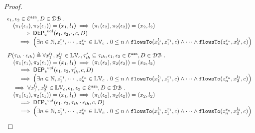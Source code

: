 \begin{proof}
$$\begin{array}{l}
\mathtt{\epsilon}_1, \mathtt{\epsilon}_2 \in \mathcal{E}^{\mathtt{{asn}}}, D \in \mathcal{DB} ~.~
\\ \quad
(\pi_{1}{(\mathtt{\epsilon}_1)}, \pi_{2}{(\mathtt{\epsilon}_1)}) = ({x}_1, l_1)
\implies
(\pi_{1}{(\mathtt{\epsilon}_2)}, \pi_{2}{(\mathtt{\epsilon}_2)}) = ({x}_2, l_2)
 \\ \qquad \implies 
\mathsf{DEP_{\mathtt{e}}}^{val}(\mathtt{\epsilon}_1, \mathtt{\epsilon}_2, \cdot, c, D)
 \\ \qquad \implies
   \Big(\exists  n \in \mathbb{N}, z_1^{r_1}, \cdots, z_n^{r_n} \in \mathbb{LV}_{{c}} ~.~ 0 \leq n
 \land \mathtt{flowsTo}(x_1^{l_1}, z_1^{r_1}, c) \land \cdots \land \mathtt{flowsTo}(z_n^{r_n}, {x}_2^{l_2}, c) \Big)
\end{array}
$$
%
$$
\begin{array}{l}
P(\mathtt{\tau}_{ih} \cdot \mathtt{\epsilon}_{ih})
\triangleq 
\forall {x}_1^{l_1}, {x}_2^{l_2} \in \mathbb{LV}_{{c}}, \mathtt{\tau}_{ih}' \subseteq \mathtt{\tau}_{ih},
\mathtt{\epsilon}_1, \mathtt{\epsilon}_2 \in \mathcal{E}^{\mathtt{{asn}}}, D \in \mathcal{DB} ~.~
\\ \quad
(\pi_{1}{(\mathtt{\epsilon}_1)}, \pi_{2}{(\mathtt{\epsilon}_1)}) = ({x}_1, l_1)
\implies
(\pi_{1}{(\mathtt{\epsilon}_2)}, \pi_{2}{(\mathtt{\epsilon}_2)}) = ({x}_2, l_2)
 \\ \qquad \implies 
\mathsf{DEP_{\mathtt{e}}}^{val}(\mathtt{\epsilon}_1, \mathtt{\epsilon}_2, \mathtt{\tau}_{ih}', c, D)
 \\ \qquad \implies
   \Big(\exists  n \in \mathbb{N}, z_1^{r_1}, \cdots, z_n^{r_n} \in \mathbb{LV}_{{c}} ~.~ 0 \leq n
 \land \mathtt{flowsTo}(x_1^{l_1}, z_1^{r_1}, c) \land \cdots \land \mathtt{flowsTo}(z_n^{r_n}, {x}_2^{l_2}, c) \Big)
\\ \quad \implies
\forall {x}_1^{l_1}, {x}_2^{l_2} \in \mathbb{LV}_{{c}},
\mathtt{\epsilon}_1, \mathtt{\epsilon}_2 \in \mathcal{E}^{\mathtt{{asn}}}, D \in \mathcal{DB} ~.~
\\ \quad
(\pi_{1}{(\mathtt{\epsilon}_1)}, \pi_{2}{(\mathtt{\epsilon}_1)}) = ({x}_1, l_1)
\implies
(\pi_{1}{(\mathtt{\epsilon}_2)}, \pi_{2}{(\mathtt{\epsilon}_2)}) = ({x}_2, l_2)
 \\ \qquad \implies 
\mathsf{DEP_{\mathtt{e}}}^{val}(\mathtt{\epsilon}_1, \mathtt{\epsilon}_2, \mathtt{\tau}_{ih} \cdot \mathtt{\epsilon}_{ih}, c, D)
 \\ \qquad \implies
   \Big(\exists  n \in \mathbb{N}, z_1^{r_1}, \cdots, z_n^{r_n} \in \mathbb{LV}_{{c}} ~.~ 0 \leq n
 \land \mathtt{flowsTo}(x_1^{l_1}, z_1^{r_1}, c) \land \cdots \land \mathtt{flowsTo}(z_n^{r_n}, {x}_2^{l_2}, c) \Big)
\end{array}
$$

\end{proof}
